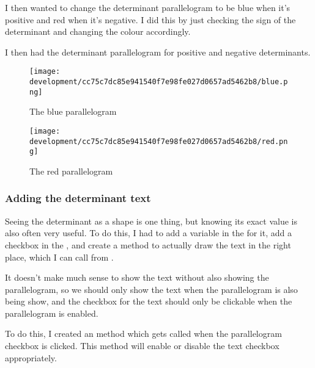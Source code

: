 \documentclass[../development.tex]{subfiles}
\begin{document}

I then wanted to change the determinant parallelogram to be blue when it's positive and red when it's negative. I did this by just checking the sign of the determinant and changing the colour accordingly.


I then had the determinant parallelogram for positive and negative determinants.

\begin{figure}[H]
\begin{minipage}{0.48\linewidth}
	\centering
	\texttt{[image: development/cc75c7dc85e941540f7e98fe027d0657ad5462b8/blue.png]}
	\caption{The blue parallelogram}
	\label{fig:development:cc75c7dc85e941540f7e98fe027d0657ad5462b8:blue.png}
\end{minipage}\hfill
\begin{minipage}{0.48\linewidth}
	\centering
	\texttt{[image: development/cc75c7dc85e941540f7e98fe027d0657ad5462b8/red.png]}
	\caption{The red parallelogram}
	\label{fig:development:cc75c7dc85e941540f7e98fe027d0657ad5462b8:red.png}
\end{minipage}
\vspace{-1em}
\end{figure}

\subsubsection{Adding the determinant text\label{development:adding-display-settings:adding-the-determinant-text}}

Seeing the determinant as a shape is one thing, but knowing its exact value is also often very useful. To do this, I had to add a variable in the  for it, add a checkbox in the , and create a method to actually draw the text in the right place, which I can call from .




It doesn't make much sense to show the text without also showing the parallelogram, so we should only show the text when the parallelogram is also being show, and the checkbox for the text should only be clickable when the parallelogram is enabled.

To do this, I created an  method which gets called when the parallelogram checkbox is clicked. This method will enable or disable the text checkbox appropriately.


\end{document}
